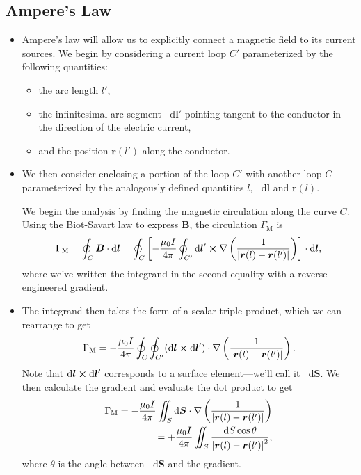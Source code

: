 \documentclass[11pt, a4paper]{article}
\newcommand{\diff}{\mathop{}\!\mathrm{d}} %
\renewcommand{\vec}[1]{\bm{#1}} %
\renewcommand{\r}{\vec{r}}
\newcommand{\B}{\vec{B}} %
\newcommand{\mm}{\mu_{0}}  %
\renewcommand{\j}{\vec{j}}  %
\renewcommand{\curl}{\nabla \cross}
\renewcommand{\grad}{\nabla}
\begin{document}
\subsection{Ampere's Law}
\begin{itemize}
	\item Ampere's law will allow us to explicitly connect a magnetic field to its current sources. We begin by considering a current loop $ C' $ parameterized by the following quantities:
    \begin{itemize}
        \item the arc length $ l' $,

        \item the infinitesimal arc segment $ \diff \vec{l}' $ pointing tangent to the conductor in the direction of the electric current,

        \item and the position $ \r(l')  $ along the conductor.
    \end{itemize}

	\item We then consider enclosing a portion of the loop $ C' $ with another  loop $ C $ parameterized by the analogously defined quantities $ l $, $ \diff \vec{l} $ and $ \r(l) $.
	
	
	We begin the analysis by finding the magnetic circulation along the curve $ C $. Using the Biot-Savart law to express $ \B $, the circulation $ \Gamma_{\text{M}} $ is
	\begin{equation*}
		\Gamma_{\text{M}} = \oint_{C} \B \cdot \diff \vec{l} = \oint_{C}\left[ - \frac{\mm I}{4 \pi} \oint_{C'}\diff \vec{l}' \cross \grad \left(\frac{1}{\abs{\r(l) - \r(l')}}\right) \right] \cdot \diff \vec{l},
	\end{equation*}
	where we've written the integrand in the second equality with a reverse-engineered gradient. 

    \item The integrand then takes the form of a scalar triple product, which we can rearrange to get
	\begin{equation*}
		\Gamma_{\text{M}} =  - \frac{\mm I}{4\pi} \oint_{C} \oint_{C'} (\diff \vec{l} \cross \diff \vec{l}') \cdot \grad \left(\frac{1}{\abs{\r(l) - \r(l')}}\right).
	\end{equation*}
	Note that $ \diff \vec{l} \cross \diff \vec{l}' $ corresponds to a surface element---we'll call it $ \diff \vec{S} $. We then calculate the gradient and evaluate the dot product to get
	\begin{align*}
		\Gamma_{\text{M}} =  - \frac{\mm I}{4\pi} \iint_{S} \diff \vec{S}\cdot \grad \left(\frac{1}{\abs{\r(l) - \r(l')}}\right) \\
		= +  \frac{\mm I}{4\pi} \iint_{S}  \frac{\diff S \cos \theta}{\abs{\r(l) - \r(l')}^{2}},
	\end{align*}
	where $ \theta $ is the angle between $ \diff \vec{S} $ and the gradient. 


\end{itemize}
\end{document}
